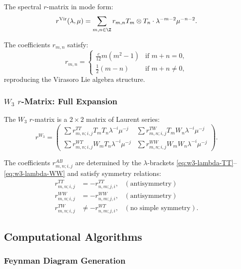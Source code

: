 The spectral $r$-matrix in mode form:
\begin{equation}
r^{\text{Vir}}(\lambda, \mu) = \sum_{m,n \in \Z} r_{m,n} T_m \otimes T_n \cdot \lambda^{-m-2} \mu^{-n-2}.
\end{equation}

The coefficients $r_{m,n}$ satisfy:
\begin{equation}
r_{m,n} = \begin{cases}
\frac{c}{12} m(m^2-1) & \text{if } m+n = 0,\\
\frac{1}{2}(m-n) & \text{if } m+n \neq 0,
\end{cases}
\end{equation}
reproducing the Virasoro Lie algebra structure.

\subsubsection{$W_3$ $r$-Matrix: Full Expansion}

The $W_3$ $r$-matrix is a $2 \times 2$ matrix of Laurent series:
\begin{equation}
r^{W_3} = \begin{pmatrix}
\sum r^{TT}_{m,n; i,j} T_m T_n \lambda^{-i} \mu^{-j} & \sum r^{TW}_{m,n; i,j} T_m W_n \lambda^{-i} \mu^{-j}\\
\sum r^{WT}_{m,n; i,j} W_m T_n \lambda^{-i} \mu^{-j} & \sum r^{WW}_{m,n; i,j} W_m W_n \lambda^{-i} \mu^{-j}
\end{pmatrix}.
\end{equation}

The coefficients $r^{AB}_{m,n; i,j}$ are determined by the $\lambda$-brackets \eqref{eq:w3-lambda-TT}--\eqref{eq:w3-lambda-WW} and satisfy symmetry relations:
\begin{align}
r^{TT}_{m,n; i,j} &= -r^{TT}_{n,m; j,i}, & (\text{antisymmetry})\\
r^{WW}_{m,n; i,j} &= -r^{WW}_{n,m; j,i}, & (\text{antisymmetry})\\
r^{TW}_{m,n; i,j} &\neq -r^{WT}_{n,m; j,i}, & (\text{no simple symmetry}).
\end{align}

\subsection{Computational Algorithms}

\subsubsection{Feynman Diagram Generation}

